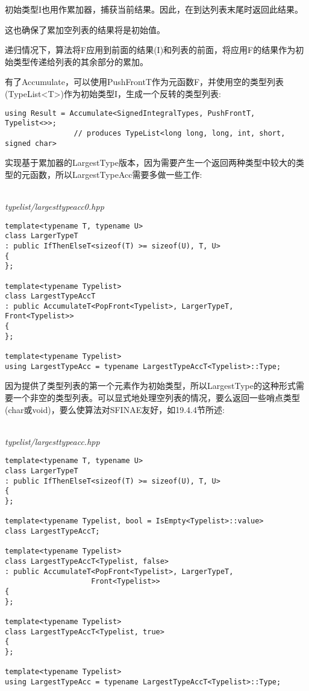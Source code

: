 初始类型I也用作累加器，捕获当前结果。因此，在到达列表末尾时返回此结果。

\begin{tcolorbox}[colback=webgreen!5!white,colframe=webgreen!75!black]
\hspace*{0.75cm}这也确保了累加空列表的结果将是初始值。
\end{tcolorbox}

递归情况下，算法将F应用到前面的结果(I)和列表的前面，将应用F的结果作为初始类型传递给列表的其余部分的累加。

有了Accumulate，可以使用PushFrontT作为元函数F，并使用空的类型列表(TypeList<T>)作为初始类型I，生成一个反转的类型列表:

\begin{lstlisting}[style=styleCXX]
using Result = Accumulate<SignedIntegralTypes, PushFrontT, Typelist<>>;
				// produces TypeList<long long, long, int, short, signed char>
\end{lstlisting}

实现基于累加器的LargestType版本，因为需要产生一个返回两种类型中较大的类型的元函数，所以LargestTypeAcc需要多做一些工作:

\hspace*{\fill} \\ %
\noindent
\textit{typelist/largesttypeacc0.hpp}
\begin{lstlisting}[style=styleCXX]
template<typename T, typename U>
class LargerTypeT
: public IfThenElseT<sizeof(T) >= sizeof(U), T, U>
{
};

template<typename Typelist>
class LargestTypeAccT
: public AccumulateT<PopFront<Typelist>, LargerTypeT,
Front<Typelist>>
{
};

template<typename Typelist>
using LargestTypeAcc = typename LargestTypeAccT<Typelist>::Type;
\end{lstlisting}

因为提供了类型列表的第一个元素作为初始类型，所以LargestType的这种形式需要一个非空的类型列表。可以显式地处理空列表的情况，要么返回一些哨点类型(char或void)，要么使算法对SFINAE友好，如19.4.4节所述:

\hspace*{\fill} \\ %
\noindent
\textit{typelist/largesttypeacc.hpp}
\begin{lstlisting}[style=styleCXX]
template<typename T, typename U>
class LargerTypeT
: public IfThenElseT<sizeof(T) >= sizeof(U), T, U>
{
};

template<typename Typelist, bool = IsEmpty<Typelist>::value>
class LargestTypeAccT;

template<typename Typelist>
class LargestTypeAccT<Typelist, false>
: public AccumulateT<PopFront<Typelist>, LargerTypeT,
					Front<Typelist>>
{
};

template<typename Typelist>
class LargestTypeAccT<Typelist, true>
{
};

template<typename Typelist>
using LargestTypeAcc = typename LargestTypeAccT<Typelist>::Type;
\end{lstlisting}

